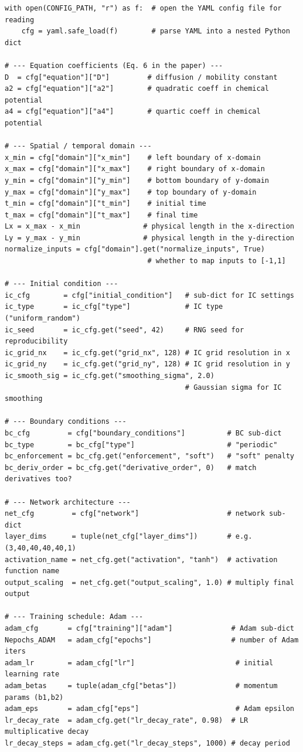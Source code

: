 \documentclass[11pt,a4paper]{article}
\begin{document}
\begin{lstlisting}
with open(CONFIG_PATH, "r") as f:  # open the YAML config file for reading
    cfg = yaml.safe_load(f)        # parse YAML into a nested Python dict

# --- Equation coefficients (Eq. 6 in the paper) ---
D  = cfg["equation"]["D"]         # diffusion / mobility constant
a2 = cfg["equation"]["a2"]        # quadratic coeff in chemical potential
a4 = cfg["equation"]["a4"]        # quartic coeff in chemical potential

# --- Spatial / temporal domain ---
x_min = cfg["domain"]["x_min"]    # left boundary of x-domain
x_max = cfg["domain"]["x_max"]    # right boundary of x-domain
y_min = cfg["domain"]["y_min"]    # bottom boundary of y-domain
y_max = cfg["domain"]["y_max"]    # top boundary of y-domain
t_min = cfg["domain"]["t_min"]    # initial time
t_max = cfg["domain"]["t_max"]    # final time
Lx = x_max - x_min               # physical length in the x-direction
Ly = y_max - y_min               # physical length in the y-direction
normalize_inputs = cfg["domain"].get("normalize_inputs", True)
                                  # whether to map inputs to [-1,1]

# --- Initial condition ---
ic_cfg        = cfg["initial_condition"]   # sub-dict for IC settings
ic_type       = ic_cfg["type"]             # IC type ("uniform_random")
ic_seed       = ic_cfg.get("seed", 42)     # RNG seed for reproducibility
ic_grid_nx    = ic_cfg.get("grid_nx", 128) # IC grid resolution in x
ic_grid_ny    = ic_cfg.get("grid_ny", 128) # IC grid resolution in y
ic_smooth_sig = ic_cfg.get("smoothing_sigma", 2.0)
                                           # Gaussian sigma for IC smoothing

# --- Boundary conditions ---
bc_cfg         = cfg["boundary_conditions"]          # BC sub-dict
bc_type        = bc_cfg["type"]                      # "periodic"
bc_enforcement = bc_cfg.get("enforcement", "soft")   # "soft" penalty
bc_deriv_order = bc_cfg.get("derivative_order", 0)   # match derivatives too?

# --- Network architecture ---
net_cfg         = cfg["network"]                     # network sub-dict
layer_dims      = tuple(net_cfg["layer_dims"])       # e.g. (3,40,40,40,40,1)
activation_name = net_cfg.get("activation", "tanh")  # activation function name
output_scaling  = net_cfg.get("output_scaling", 1.0) # multiply final output

# --- Training schedule: Adam ---
adam_cfg       = cfg["training"]["adam"]              # Adam sub-dict
Nepochs_ADAM   = adam_cfg["epochs"]                   # number of Adam iters
adam_lr        = adam_cfg["lr"]                        # initial learning rate
adam_betas     = tuple(adam_cfg["betas"])              # momentum params (b1,b2)
adam_eps       = adam_cfg["eps"]                       # Adam epsilon
lr_decay_rate  = adam_cfg.get("lr_decay_rate", 0.98)  # LR multiplicative decay
lr_decay_steps = adam_cfg.get("lr_decay_steps", 1000) # decay period


\end{lstlisting}
\end{document}
